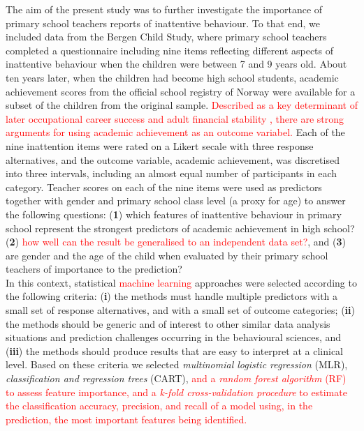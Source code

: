 \documentclass[10pt,letterpaper]{article}
\begin{document}
The aim of the present study was to further investigate the importance of primary school teachers reports of inattentive behaviour. 
To that end, we included data from the Bergen Child Study, where primary school teachers completed a questionnaire including nine items 
reflecting different aspects of inattentive behaviour when the children were between 7 and 9 years old. About ten years later, when the children 
had become high school students, academic achievement scores from the official school registry of Norway were available for a subset of 
the children from the original sample. \textcolor{red}{Described as a key determinant of later occupational career success and adult
financial stability \cite{Fried2016}, there are strong arguments for using academic achievement as an outcome variabel.} Each of the nine inattention items were rated on a 
Likert secale with three response alternatives, and the outcome variable, academic achievement, was discretised into three intervals, including an almost equal number 
of participants in each category.  Teacher scores on each of the nine items were used as predictors together with gender and primary school class level (a proxy for age) 
to answer the following questions: ({\bf1}) which features of inattentive behaviour in primary school represent the strongest predictors of academic achievement in 
high school? ({\bf 2}) \textcolor{red}{how well can the result be generalised to an independent data set?}, and ({\bf3}) are gender and the age of the child 
when evaluated by their primary school teachers of importance to the prediction?  \\ 

In this context, statistical \textcolor{red}{machine learning} approaches were selected according to the following criteria: ({\bf i}) the methods must handle multiple predictors with a small set of response alternatives, and with a small set of outcome categories; ({\bf ii}) the methods should be generic and of interest to other similar data analysis situations  
and prediction challenges  occurring in the behavioural sciences, and ({\bf iii}) the methods should produce results that are easy to interpret at a clinical level. 
Based on these criteria we selected {\em multinomial logistic regression} (MLR), {\em classification and regression trees} (CART), \textcolor{red}{and a {\em random forest algorithm} (RF) to assess feature importance, and a {\em k-fold cross-validation procedure} to estimate the classification accuracy,  precision, and recall of a model using, in the prediction, the most important features being identified.} 
\end{document}
